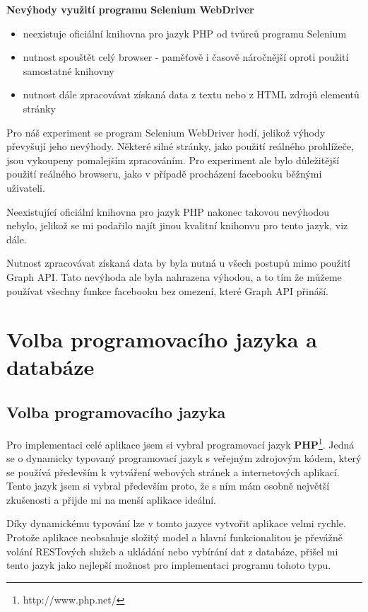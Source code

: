 \documentclass[thesis=M,czech]{FITthesis}[2013/05/10]
\begin{document}
\textbf{Nevýhody využití programu Selenium WebDriver}

\begin{itemize}
  \item neexistuje oficiální knihovna pro jazyk PHP 
  od tvůrců programu Selenium
  \item nutnost spouštět celý browser - paměťově i časově náročnější
  oproti použití samostatné knihovny
  \item nutnost dále zpracovávat získaná data z textu nebo z HTML zdrojů elementů stránky
\end{itemize}

Pro náš experiment se program Selenium WebDriver hodí, jelikož výhody převyšují jeho nevýhody. Některé silné stránky, jako použití reálného prohlížeče, jsou vykoupeny pomalejším zpracováním. Pro experiment ale bylo důležitější použití reálného browseru, jako v případě procházení facebooku běžnými uživateli.

Neexistující oficiální knihovna pro jazyk PHP nakonec takovou nevýhodou nebylo, jelikož se mi podařilo najít jinou kvalitní knihonvu pro tento jazyk, viz dále.

Nutnost zpracovávat získaná data by byla nutná u všech postupů mimo použití Graph API. Tato nevýhoda ale byla nahrazena výhodou, a to tím že můžeme používat všechny funkce facebooku bez omezení, které Graph API přináší.

\section{Volba programovacího jazyka a databáze}

\subsection{Volba programovacího jazyka}

Pro implementaci celé aplikace jsem si vybral programovací jazyk \textbf{PHP}\footnote{http://www.php.net/}. Jedná se o dynamicky typovaný programovací jazyk s veřejným zdrojovým kódem, který se používá především k vytváření webových stránek a internetových aplikací. Tento jazyk jsem si vybral především proto, že s ním mám osobně největší zkušenosti a přijde mi na menší aplikace ideální. 

Díky dynamickému typování lze v tomto jazyce vytvořit aplikace velmi rychle. Protože aplikace neobsahuje složitý model a hlavní funkcionalitou je převážně volání RESTových služeb a ukládání nebo vybírání dat z databáze, přišel mi tento jazyk jako nejlepší možnost pro implementaci programu tohoto typu.
\end{document}
